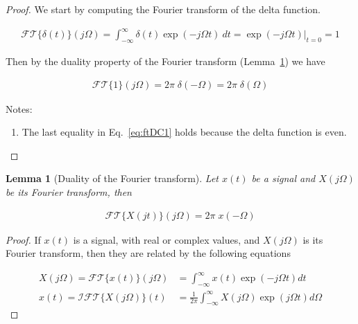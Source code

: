 \documentclass[12pt]{article}
\newtheorem{lemma}{Lemma}
\begin{document}
\begin{appendices}
    \begin{proof}
        We start by computing the Fourier transform of the delta function.

        \begin{align}
            \mathcal{FT}\{\delta(t)\}(j\Omega)=\int_{-\infty}^\infty\delta(t)\exp\left(-j\Omega t\right)\ dt=\left.\exp\left(-j\Omega t\right)\right |_{t=0}=1
        \end{align}

        Then by the duality property of the Fourier transform
        (Lemma~\ref{lemma:ftDuality}) we have

        \begin{align}
            \mathcal{FT}\{1\}(j\Omega)=2\pi\;\delta(-\Omega)=2\pi\;\delta(\Omega)\label{eq:ftDC1}
        \end{align}

        Notes:
        \begin{enumerate}

            \item The last equality in Eq.~\ref{eq:ftDC1} holds because the
                delta function is even.

        \end{enumerate}
    \end{proof}

    \begin{lemma}[Duality of the Fourier transform]

        Let $x(t)$ be a signal and $X(j\Omega)$ be its Fourier transform, then

        \begin{align}
            \mathcal{FT}\{X(jt)\}(j\Omega)=2\pi\;x(-\Omega)
        \end{align}

        \label{lemma:ftDuality}
    \end{lemma}

    \begin{proof}
        If $x(t)$ is a signal, with real or complex values, and
        $X(j\Omega)$ is its Fourier transform, then they are related by the
        following equations \citep[][Section 2.1]{porat97}

        \begin{align}
            X(j\Omega)=\mathcal{FT}\{x(t)\}(j\Omega)&=\int_{-\infty}^\infty x(t)\exp\left(-j\Omega t\right)dt\label{eq:ft}\\
            x(t)=\mathcal{IFT}\{X(j\Omega)\}(t)&=\frac{1}{2\pi}\int_{-\infty}^\infty X(j\Omega)\exp\left(j\Omega t\right)d\Omega\label{eq:ift}
        \end{align}


\end{proof}
\end{appendices}
\end{document}
